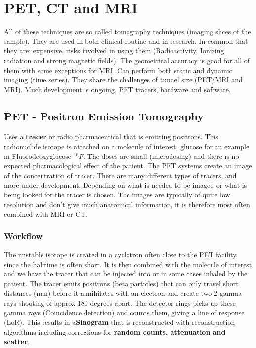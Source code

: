 \section{PET, CT and MRI}
All of these techniques are so called tomography techniques (imaging slices of the sample). They are used in both clinical routine and in research. In common that they are: expensive, risks involved in using them (Radioactivity, Ionizing radiation and strong magnetic fields). The geometrical accuracy is good for all of them with some exceptions for MRI. Can perform both static and dynamic imaging (time series). They share the challenges of tunnel size (PET/MRI and MRI). Much development is ongoing, PET tracers, hardware and software. 

	\subsection*{PET - Positron Emission Tomography}
	Uses a \textbf{tracer} or radio pharmaceutical that is emitting positrons. This radionuclide isotope is attached on a molecule of interest, glucose for an example in Fluorodeoxyglucose $^{18}F$. The doses are small (microdosing) and there is no expected pharmacological effect of the patient. The PET systems create an image of the concentration of tracer. There are many different types of tracers, and more under development. Depending on what is needed to be imaged or what is being looked for the tracer is chosen. The images are typically of quite low resolution and don't give much anatomical information, it is therefore most often combined with MRI or CT. 

		\subsubsection*{Workflow}
		The unstable isotope is created in a cyclotron often close to the PET facility, since the halftime is often short. It is then combined with the molecule of interest and we have the tracer that can be injected into or in some cases inhaled by the patient. The tracer emits positrons (beta particles) that can only travel short distances (mm) before it annihilates with an electron and create two 2 gamma rays shooting of approx 180 degrees apart. The detector rings picks up these gamma rays (Coincidence detection) and counts them, giving a line of response (LoR). This results in a\textbf{Sinogram} that is reconstructed with reconstruction algorithms including corrections for \textbf{random counts, attenuation and scatter}. 


